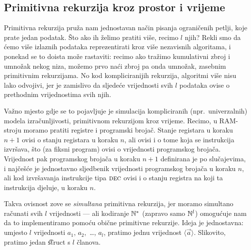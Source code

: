\subsection{Primitivna rekurzija kroz prostor i vrijeme}

Primitivna rekurzija pruža nam jednostavan način pisanja ograničenih petlji, koje prate jedan podatak. Što ako ih želimo pratiti više, recimo $l$ njih? Rekli smo da ćemo više izlaznih podataka reprezentirati kroz više nezavisnih algoritama, i ponekad se to doista može rastaviti: recimo ako tražimo kumulativni zbroj i umnožak nekog niza, možemo prvo naći zbroj pa onda umnožak, zasebnim primitivnim rekurzijama. No kod kompliciranijih rekurzija, algoritmi više nisu lako odvojivi, jer je zamislivo da sljedeće vrijednosti svih $l$ podataka ovise o prethodnim vrijednostima svih njih.

Važno mjesto gdje se to pojavljuje je simulacija kompliciranih (npr.\ univerzalnih) modela izračunljivosti, primitivnom rekurzijom kroz vrijeme. Recimo, u RAM-stroju moramo pratiti registre i programski brojač. Stanje registara u koraku $n+1$ ovisi o stanju registara u koraku $n$, ali ovisi i o tome koja se instrukcija izvršava, što (za fiksni program) ovisi o vrijednosti programskog brojača. Vrijednost pak programskog brojača u koraku $n+1$ definirana je po slučajevima, i najčešće je jednostavno sljedbenik vrijednosti programskog brojača u koraku $n$, ali kod izvršavanja instrukcije tipa $\textsc{dec}$ ovisi i o stanju registra na koji ta instrukcija djeluje, u koraku $n$.

Takva ovisnost zove se \emph{simultana} primitivna rekurzija, jer moramo simultano ra\-ču\-na\-ti svih $l$ vrijednosti --- ali kodiranje ${\mathbb N}^*$ (zapravo samo ${\mathbb N}^l$) omogućuje nam da to implementiramo pomoću obične primitivne rekurzije. Ideja je jednostavna: umjesto $l$ vrijednosti $a_1$, $a_2$,~\ldots, $a_l$, pratimo jednu vrijednost $\langle\vec a\rangle$. Slikovito, pratimo jedan \t{struct} s $l$ članova.

